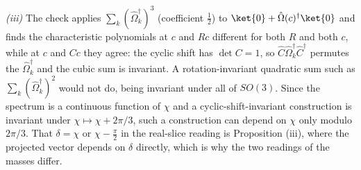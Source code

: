 \emph{(iii)} The check applies $\sum_{k}(\hat\Omega_{k}^{\dagger})^{3}$ (coefficient $\tfrac12$) to $\ket{0} + \hat\Omega(c)^{\dagger}\ket{0}$ and finds the characteristic polynomials at $c$ and $Rc$ different for both $R$ and both $c$, while at $c$ and $Cc$ they agree: the cyclic shift has $\det C = 1$, so $\hat{C}\hat\Omega_{k}^{\dagger}\hat{C}^{\dagger}$ permutes the $\hat\Omega_{k}^{\dagger}$ and the cubic sum is invariant. A rotation-invariant quadratic sum such as $\sum_{k}(\hat\Omega_{k}^{\dagger})^{2}$ would not do, being invariant under all of $SO(3)$. Since the spectrum is a continuous function of $\chi$ and a cyclic-shift-invariant construction is invariant under $\chi \mapsto \chi + 2\pi/3$, such a construction can depend on $\chi$ only modulo $2\pi/3$. That $\delta = \chi$ or $\chi - \tfrac{\pi}{2}$ in the real-slice reading is Proposition (iii), where the projected vector depends on $\delta$ directly, which is why the two readings of the masses differ.
